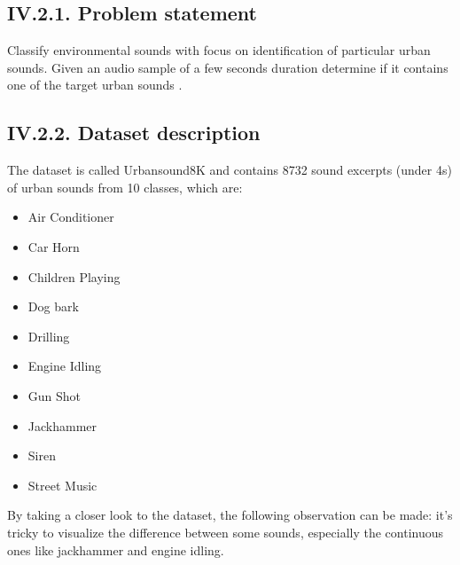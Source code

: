 \documentclass[11pt, a4papper]{report}
\theoremstyle{plain}
\theoremstyle{definition}
\theoremstyle{definition}
\theoremstyle{proposition}
\begin{document}
\subsection*{IV.2.1. Problem statement}

Classify environmental sounds with focus on identification of particular urban sounds. Given an audio sample of a few seconds duration determine if it contains one of the target urban sounds \cite{12}.

\subsection*{IV.2.2. Dataset description}

The dataset is called Urbansound8K and contains 8732 sound excerpts (under 4s) of urban sounds from 10 classes, which are:

\begin{itemize}
\item Air Conditioner
\item Car Horn
\item Children Playing
\item Dog bark
\item Drilling
\item Engine Idling
\item Gun Shot
\item Jackhammer
\item Siren
\item Street Music
\end{itemize}

By taking a closer look to the dataset, the following observation can be made: it's tricky to visualize the difference between some sounds, especially the continuous ones like jackhammer and engine idling.
\end{document}
